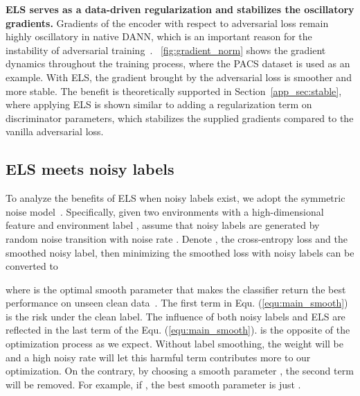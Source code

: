 \documentclass{article} \usepackage{iclr2023_conference,times}
\newcommand{\ls}[0]{ELS\xspace}
\newcommand{\myref}[1]{Equ. (\ref{#1})}
\begin{document}
\textbf{\ls serves as a data-driven regularization and stabilizes the  oscillatory gradients.} Gradients of the encoder with respect to adversarial loss remain highly oscillatory in native DANN, which is an important reason for the instability of adversarial training~\citep{mescheder2018training}. \figurename~\ref{fig:gradient_norm} shows the gradient dynamics throughout the training process, where the PACS dataset is used as an example. With \ls, the gradient brought by the adversarial loss is smoother and more stable. The benefit is theoretically supported in Section~\ref{app_sec:stable}, where applying \ls is shown similar to adding a regularization term on discriminator parameters, which stabilizes the supplied gradients compared to the vanilla adversarial loss. 

\vspace{-0.15cm}
\subsection{\ls meets noisy labels}
\vspace{-0.15cm}
To analyze the benefits of \ls when noisy labels exist, we  adopt the symmetric noise model~\citep{kim2019nlnl}. Specifically, given two environments with a high-dimensional feature  and environment label , assume that noisy labels  are generated by random noise transition with noise rate . Denote ,  the cross-entropy loss and  the smoothed noisy label, then minimizing the smoothed loss with noisy labels can be converted to

where  is the optimal smooth parameter that makes the classifier return the best performance on unseen clean data~\citep{wei2021smooth}. The first term in \myref{equ:main_smooth} is the risk under the clean label. The influence of both noisy labels and \ls are reflected in the last term of the \myref{equ:main_smooth}.  is the opposite of the optimization process as we expect. Without label smoothing, the weight will be  and a high noisy rate  will let this harmful term contributes more to our optimization. On the contrary, by choosing a smooth parameter , the second term will be removed. For example, if , the best smooth parameter is just .

\vspace{-0.15cm}
\end{document}
